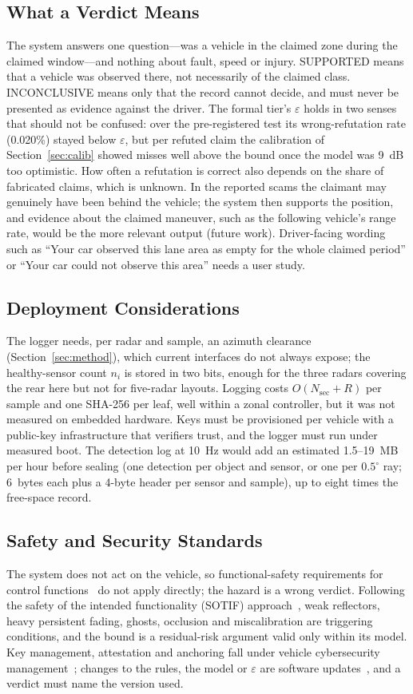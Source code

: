 \subsection{What a Verdict Means}\label{sec:verdict}
The system answers one question---was a vehicle in the claimed zone during the claimed window---and nothing about fault, speed or injury. SUPPORTED means that a vehicle was observed there, not necessarily of the claimed class. INCONCLUSIVE means only that the record cannot decide, and must never be presented as evidence against the driver. The formal tier's $\varepsilon$ holds in two senses that should not be confused: over the pre-registered test its wrong-refutation rate (0.020\%) stayed below $\varepsilon$, but per refuted claim the calibration of Section~\ref{sec:calib} showed misses well above the bound once the model was 9~dB too optimistic. How often a refutation is correct also depends on the share of fabricated claims, which is unknown. In the reported scams the claimant may genuinely have been behind the vehicle; the system then supports the position, and evidence about the claimed maneuver, such as the following vehicle's range rate, would be the more relevant output (future work). Driver-facing wording such as ``Your car observed this lane area as empty for the whole claimed period'' or ``Your car could not observe this area'' needs a user study.

\subsection{Deployment Considerations}
The logger needs, per radar and sample, an azimuth clearance (Section~\ref{sec:method}), which current interfaces do not always expose; the healthy-sensor count $n_i$ is stored in two bits, enough for the three radars covering the rear here but not for five-radar layouts. Logging costs $O(N_{\mathrm{sec}} + R)$ per sample and one SHA-256 per leaf, well within a zonal controller, but it was not measured on embedded hardware. Keys must be provisioned per vehicle with a public-key infrastructure that verifiers trust, and the logger must run under measured boot. The detection log at 10~Hz would add an estimated 1.5--19~MB per hour before sealing (one detection per object and sensor, or one per $0.5^\circ$ ray; 6~bytes each plus a 4-byte header per sensor and sample), up to eight times the free-space record.

\subsection{Safety and Security Standards}
The system does not act on the vehicle, so functional-safety requirements for control functions~\cite{b51} do not apply directly; the hazard is a wrong verdict. Following the safety of the intended functionality (SOTIF) approach~\cite{b50}, weak reflectors, heavy persistent fading, ghosts, occlusion and miscalibration are triggering conditions, and the bound is a residual-risk argument valid only within its model. Key management, attestation and anchoring fall under vehicle cybersecurity management~\cite{b52,b56}; changes to the rules, the model or $\varepsilon$ are software updates~\cite{b53}, and a verdict must name the version used.

